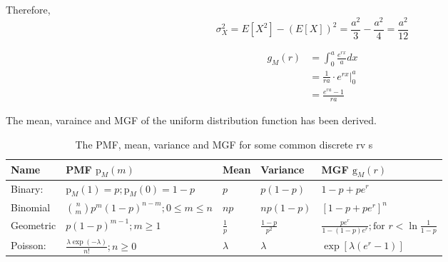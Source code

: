 \documentclass[UTF8]{article}
\begin{document}
\begin{enumerate}
            Therefore, 
            \begin{equation*}
                \sigma^2_X=E[X^2]-(E[X])^2=\frac{a^2}{3}-\frac{a^2}{4}=\frac{a^2}{12}
            \end{equation*}
            
            \begin{equation*}
                \begin{split}
                    g_M(r)&=\int^a_0\frac{e^{rx}}{a}dx\\
                    &=\frac{1}{ra}\cdot e^{rx}\big|^a_0\\
                    &=\frac{e^{ra}-1}{ra}
                \end{split}
            \end{equation*}

            The mean, varaince and MGF of the uniform distribution function has been derived.
    \end{enumerate}

    \begin{table}[h]
        \centering
        \caption{The PMF, mean, variance and MGF for some common discrete rv s}
        \begin{spacing}{2.0}
            \begin{tabular}{lllll}
                \hline
                Name & PMF $\text{p}_M(m)$ & Mean & Variance & MGF $\text{g}_M(r)$\\
                \hline
                Binary: & $\text{p}_M(1)=p;\text{p}_M(0)=1-p$ & $p$ & $p(1-p)$ & $1-p+pe^r$\\
                Binomial & $\binom{n}{m}p^m(1-p)^{n-m};0\leq m\leq n$ & $np$ & $np(1-p)$ & $[1-p+pe^r]^n$\\
                Geometric & $p(1-p)^{m-1};m\geq1$ & $\frac{1}{p}$ & $\frac{1-p}{p^2}$ & $\frac{pe^r}{1-(1-p)e^r};\text{for }r<\ln\frac{1}{1-p}$\\
                Poisson: & $\frac{\lambda\exp(-\lambda)}{n!};n\geq0$ & $\lambda$ & $\lambda$ & $\exp[\lambda(e^r-1)]$\\
                \hline           
            \end{tabular}
        \end{spacing}
    \end{table}
\end{document}
